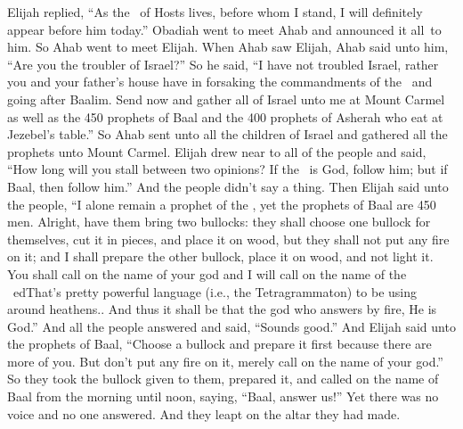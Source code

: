 \begin{inparaenum}
   Elijah replied, ``As the \lord\ of Hosts lives, before whom I stand, I will definitely appear before him today.''%
   Obadiah went to meet Ahab and announced it all\understood{}\ to him. So Ahab went to meet Elijah.%
   When Ahab saw Elijah, Ahab said unto him, ``Are you the troubler of Israel?''%
   So he said, ``I have not troubled Israel, rather you and your father's house have in forsaking the commandments of the \lord\ and going after Baalim.%
   Send now and gather all of Israel unto me at Mount Carmel as well as the 450 prophets of Baal and the 400 prophets of Asherah who eat at Jezebel's table.''%
   So Ahab sent unto all the children of Israel and gathered all the prophets unto Mount Carmel.%
   Elijah drew near to all of the people and said, ``How long will you stall between two opinions? If the \lord\ is God, follow him; but if Baal, then follow him.'' And the people didn't say a thing.%
   Then Elijah said unto the people, ``I alone remain a prophet of the \lord, yet the prophets of Baal are 450 men.%
   Alright, have them bring two bullocks: they shall choose one bullock for themselves, cut it in pieces, and place it on wood, but they shall not put any fire on it; and I shall prepare the other bullock, place it on wood, and not light it.%
   You shall call on the name of your god and I will call on the name of the \lord\ ed{That's pretty powerful language (i.e., the Tetragrammaton) to be using around heathens.}. And thus it shall be that the god who answers by fire, He is God.'' And all the people answered and said, ``Sounds good.''%
   And Elijah said unto the prophets of Baal, ``Choose a bullock and prepare it first because there are more of you. But don't put any fire on it, merely call on the name of your god.''%
   So they took the bullock given to them, prepared it, and called on the name of Baal from the morning until noon, saying, ``Baal, answer us!'' Yet there was no voice and no one answered. And they leapt on the altar they had made.%

\end{inparaenum}
